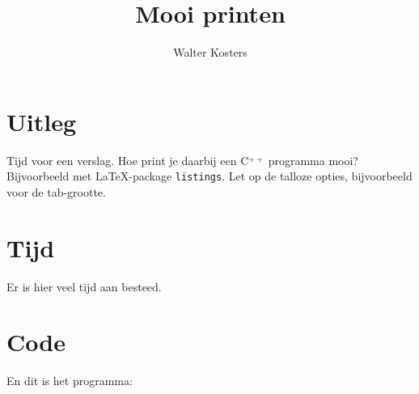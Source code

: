 \documentclass[10pt]{article}
\title{Mooi printen}
\author{Walter Kosters}
\begin{document}

\maketitle

\section{Uitleg}
Tijd voor een verslag.
Hoe print je daarbij een C$\stackrel{++}{}$ programma mooi?
Bijvoorbeeld met \LaTeX-package \verb+listings+.
Let op de talloze opties, bijvoorbeeld voor de tab-grootte.

\section{Tijd}
Er is hier veel tijd aan besteed.

\section*{Code}
En dit is het programma:


\end{document}
